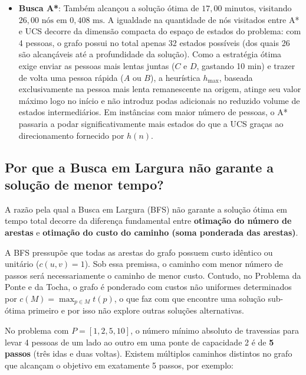 \begin{itemize}[leftmargin=1.5cm]
	\item \textbf{Busca A*}: Também alcançou a solução ótima de
	      $17{,}00\text{ minutos}$, visitando $26{,}00\text{ nós}$ em $0{,}408\text{ ms}$.
	      A igualdade na quantidade de nós visitados entre A* e UCS decorre da dimensão
	      compacta do espaço de estados do problema: com 4 pessoas, o grafo possui no
	      total apenas 32 estados possíveis (dos quais 26 são alcançáveis até a profundidade
	      da solução). Como a estratégia ótima exige enviar as pessoas mais lentas juntas
	      ($C$ e $D$, gastando 10 min) e trazer de volta uma pessoa rápida ($A$ ou $B$), a
	      heurística $h_{\max}$, baseada exclusivamente na pessoa mais lenta remanescente na
	      origem, atinge seu valor máximo logo no início e não introduz podas adicionais no
	      reduzido volume de estados intermediários. Em instâncias com maior número de pessoas,
	      o A* passaria a podar significativamente mais estados do que a UCS graças ao
	      direcionamento fornecido por $h(n)$.
\end{itemize}

\subsection{Por que a Busca em Largura não garante a solução de menor tempo?}
\label{subsec:por-que-bfs-nao-garante-otimo}

A razão pela qual a Busca em Largura (BFS) não garante a solução ótima em tempo total
decorre da diferença fundamental entre \textbf{otimação do número de arestas} e
\textbf{otimação do custo do caminho (soma ponderada das arestas)}.

A BFS pressupõe que todas as arestas do grafo possuem custo idêntico ou unitário
($c(u, v) = 1$). Sob essa premissa, o caminho com menor número de passos será
necessariamente o caminho de menor custo. Contudo, no Problema da Ponte e da Tocha, o
grafo é ponderado com custos não uniformes determinados por $c(M) = \max_{p \in M} t(p)$,
o que faz com que encontre uma solução sub-ótima primeiro e por isso não explore outras
soluções alternativas.

No problema com $P = [1, 2, 5, 10]$, o número mínimo absoluto de travessias para levar 4 pessoas de um lado ao outro em uma ponte de capacidade 2 é de \textbf{5 passos} (três idas e duas voltas). Existem múltiplos caminhos distintos no grafo que alcançam o objetivo em exatamente 5 passos, por exemplo:

